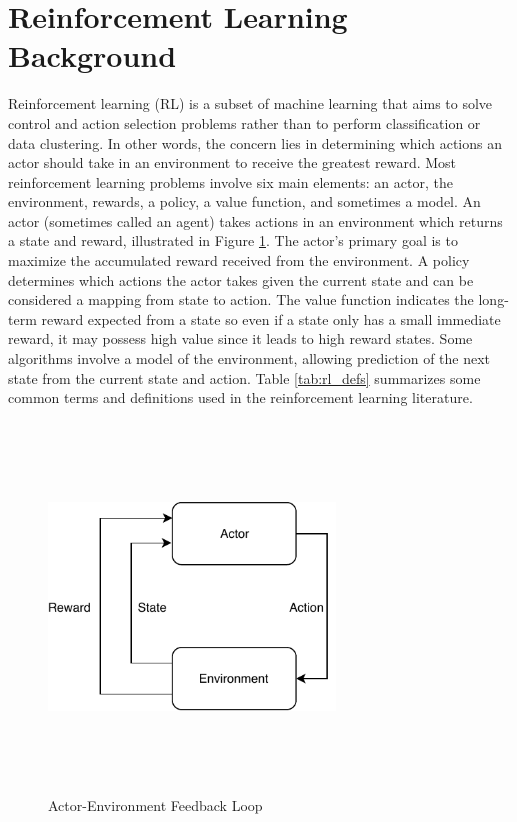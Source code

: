 \section{Reinforcement Learning Background}
Reinforcement learning (RL) is a subset of machine learning that aims to solve control and action selection problems rather than to perform classification or data clustering. In other words, the concern lies in determining which actions an actor should take in an environment to receive the greatest reward. Most reinforcement learning problems involve six main elements: an actor, the environment, rewards, a policy, a value function, and sometimes a model. An actor (sometimes called an agent) takes actions in an environment which returns a state and reward, illustrated in Figure \ref{fig:actor_env_loop}. The actor's primary goal is to maximize the accumulated reward received from the environment. A policy determines which actions the actor takes given the current state and can be considered a mapping from state to action. The value function indicates the long-term reward expected from a state so even if a state only has a small immediate reward, it may possess high value since it leads to high reward states. Some algorithms involve a model of the environment, allowing prediction of the next state from the current state and action. Table \ref{tab:rl_defs} summarizes some common terms and definitions used in the reinforcement learning literature.
\begin{figure}[H]   %
	\centering \includegraphics[width=3in, height=3.85in, keepaspectratio]{figures/actor_env_loop.pdf}
	\caption{Actor-Environment Feedback Loop}\label{fig:actor_env_loop}
\end{figure}

